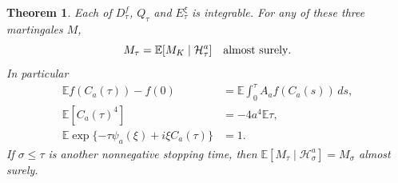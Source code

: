 \documentclass[11pt]{article}
\newtheorem{theorem}{Theorem}[section]
\newcommand{\E}{\mathbb E}\newcommand{\Pp}{\mathbb P}
\begin{document}
\begin{theorem}\label{thm:markedstopping}
Each of $D_\tau^f$, $Q_\tau$ and $E_\tau^\xi$ is integrable.
For any of these three martingales $M$,
\begin{equation}\label{eq:stoppedclosed}
 M_\tau=\E[M_K\mid\mathcal H_\tau^a]\quad\hbox{almost surely}.
\end{equation}
In particular
\begin{align}
 \E f(C_a(\tau))-f(0)
   &=\E\int_0^\tau A_af(C_a(s))\,ds,\label{eq:stoppeddynkin}\\
 \E[C_a(\tau)^4]&=-4a^4\E\tau,\label{eq:stoppedquartic}\\
 \E\exp\{-\tau\psi_a(\xi)+i\xi C_a(\tau)\}&=1.
 \label{eq:stoppedexponential}
\end{align}
If $\sigma\leq\tau$ is another nonnegative stopping time, then
$\E[M_\tau\mid\mathcal H_\sigma^a]=M_\sigma$ almost surely.
\end{theorem}
\end{document}
